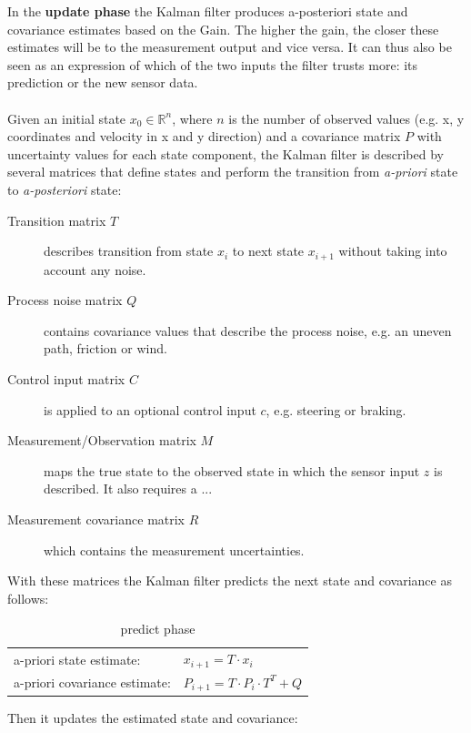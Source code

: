 In the \textbf{update phase} the Kalman filter produces a-posteriori state and covariance estimates based on the Gain. The higher the gain, the closer these estimates will be to the measurement output and vice versa. It can thus also be seen as an expression of which of the two inputs the filter trusts more: its prediction or the new sensor data.
\\\\
Given an initial state $x_0\in \mathbb{R}^n$, where $n$ is the number of observed values (e.g. x, y coordinates and velocity in x and y direction) and a covariance matrix $P$ with uncertainty values for each state component, the Kalman filter is described by several matrices that define states and perform the transition from \textit{a-priori} state to \textit{a-posteriori} state:
\begin{description}
\item[Transition matrix $T$] describes transition from state $x_i$ to next state $x_{i+1}$ without taking into account any noise.
\item[Process noise matrix $Q$] contains covariance values that describe the process noise, e.g. an uneven path, friction or wind.
\item[Control input matrix $C$] is applied to an optional control input $c$, e.g. steering or braking.
\item[Measurement/Observation matrix $M$] maps the true state to the observed state in which the sensor input $z$ is described. It also requires a ...
\item[Measurement covariance matrix $R$] which contains the measurement uncertainties.
\end{description}

With these matrices the Kalman filter predicts the next state and covariance as follows:
\begin{table}[ht]
\begin{center}
\begin{tabular}{l l}
a-priori state estimate: & $x_{i+1} = T \cdot x_i$ \\
a-priori covariance estimate: & $P_{i+1} = T \cdot P_i \cdot T^T + Q$\\
\end{tabular}
\caption{predict phase}
\end{center}
\end{table}

Then it updates the estimated state and covariance:

